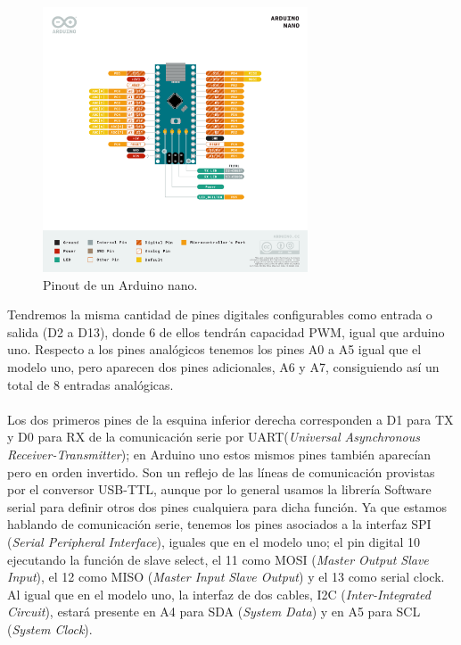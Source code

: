 \documentclass[12pt]{article}
\begin{document}
	\begin{figure}[h]
		\begin{center}
			\includegraphics[width=0.7\textwidth]{img/Pinout-NANO_official.png}
			\caption{Pinout de un Arduino nano.}
			\label{Pinout Arduino nano}
		\end{center}
	\end{figure}

	\pagebreak
	
	\noindent Tendremos la misma cantidad de pines digitales configurables como entrada o salida (D2 a D13), donde 6 de ellos tendrán capacidad PWM, igual que arduino uno. Respecto a los pines analógicos tenemos los pines A0 a A5 igual que el modelo uno, pero aparecen dos pines adicionales, A6 y A7, consiguiendo así un total de 8 entradas analógicas. \\
	
	 \\
	
	\noindent Los dos primeros pines de la esquina inferior derecha corresponden a D1 para TX y D0 para RX de la comunicación serie por UART(\textit{Universal Asynchronous Receiver-Transmitter}); en Arduino uno estos mismos pines también aparecían pero en orden invertido. Son un reflejo de las líneas de comunicación provistas por el conversor USB-TTL, aunque por lo general usamos la librería Software serial para definir otros dos pines cualquiera para dicha función. Ya que estamos hablando de comunicación serie, tenemos los pines asociados a la interfaz SPI (\textit{Serial Peripheral Interface}), iguales que en el modelo uno; el pin digital 10 ejecutando la función de slave select, el 11 como MOSI (\textit{Master Output Slave Input}), el 12 como MISO (\textit{Master Input Slave Output}) y el 13 como serial clock. Al igual que en el modelo uno, la interfaz de dos cables, I2C (\textit{Inter-Integrated Circuit}), estará presente en A4 para SDA (\textit{System Data}) y en A5 para SCL (\textit{System Clock}). \\
	
\end{document}
